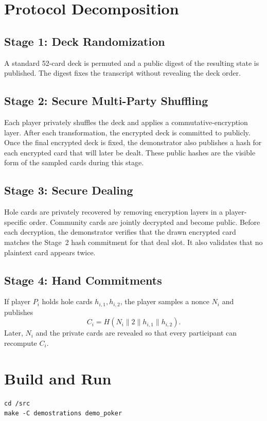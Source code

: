 \section{Protocol Decomposition}
\subsection*{Stage 1: Deck Randomization}
A standard 52-card deck is permuted and a public digest of the resulting state
is published. The digest fixes the transcript without revealing the deck order.

\subsection*{Stage 2: Secure Multi-Party Shuffling}
Each player privately shuffles the deck and applies a commutative-encryption
layer. After each transformation, the encrypted deck is committed to publicly.
Once the final encrypted deck is fixed, the demonstrator also publishes a hash
for each encrypted card that will later be dealt. These public hashes are the
visible form of the sampled cards during this stage.

\subsection*{Stage 3: Secure Dealing}
Hole cards are privately recovered by removing encryption layers in a
player-specific order. Community cards are jointly decrypted and become public.
Before each decryption, the demonstrator verifies that the drawn encrypted card
matches the Stage~2 hash commitment for that deal slot. It also validates that
no plaintext card appears twice.

\subsection*{Stage 4: Hand Commitments}
If player \(P_i\) holds hole cards \(h_{i,1}, h_{i,2}\), the player samples a
nonce \(N_i\) and publishes
\[
    C_i = H\!\left(N_i \parallel 2 \parallel h_{i,1} \parallel h_{i,2}\right).
\]
Later, \(N_i\) and the private cards are revealed so that every participant can
recompute \(C_i\).

\section{Build and Run}
\begin{verbatim}
cd /src
make -C demostrations demo_poker
\end{verbatim}


